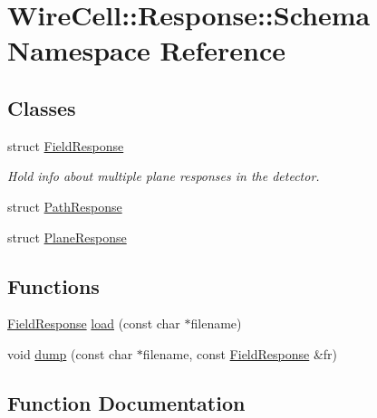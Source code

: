 \hypertarget{namespace_wire_cell_1_1_response_1_1_schema}{}\section{Wire\+Cell\+:\+:Response\+:\+:Schema Namespace Reference}
\label{namespace_wire_cell_1_1_response_1_1_schema}
\subsection*{Classes}
\begin{DoxyCompactItemize}
\item 
struct \hyperlink{struct_wire_cell_1_1_response_1_1_schema_1_1_field_response}{Field\+Response}
\begin{DoxyCompactList}\small\item\em Hold info about multiple plane responses in the detector. \end{DoxyCompactList}\item 
struct \hyperlink{struct_wire_cell_1_1_response_1_1_schema_1_1_path_response}{Path\+Response}
\item 
struct \hyperlink{struct_wire_cell_1_1_response_1_1_schema_1_1_plane_response}{Plane\+Response}
\end{DoxyCompactItemize}
\subsection*{Functions}
\begin{DoxyCompactItemize}
\item 
\hyperlink{struct_wire_cell_1_1_response_1_1_schema_1_1_field_response}{Field\+Response} \hyperlink{namespace_wire_cell_1_1_response_1_1_schema_a4b86873ce3e615148bc29b75b74bab9c}{load} (const char $\ast$filename)
\item 
void \hyperlink{namespace_wire_cell_1_1_response_1_1_schema_a2cc7d597fb84460da8289804c7356a46}{dump} (const char $\ast$filename, const \hyperlink{struct_wire_cell_1_1_response_1_1_schema_1_1_field_response}{Field\+Response} \&fr)
\end{DoxyCompactItemize}


\subsection{Function Documentation}
\mbox{\label{namespace_wire_cell_1_1_response_1_1_schema_a2cc7d597fb84460da8289804c7356a46}} 
